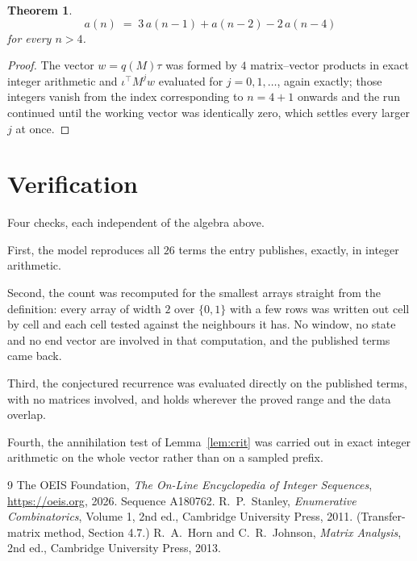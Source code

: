 \documentclass[11pt,a4paper]{article}
\theoremstyle{plain}
\newtheorem{theorem}{Theorem}
\theoremstyle{definition}
\begin{document}
\begin{theorem}
\[
a(n)\;=\;3\,a(n-1) + a(n-2) - 2\,a(n-4)
\]
for every $n>4$.
\end{theorem}

\begin{proof}
The vector $w=q(M)\tau$ was formed by $4$ matrix--vector products in exact integer
arithmetic and $\iota^{\!\top}M^{j}w$ evaluated for $j=0,1,\dots$, again exactly; those
integers vanish from the index corresponding to $n=4+1$ onwards and the run continued
until the working vector was identically zero, which settles every larger $j$ at once.
\end{proof}

\section{Verification}

Four checks, each independent of the algebra above.

First, the model reproduces all $26$ terms the entry publishes, exactly, in integer
arithmetic.

Second, the count was recomputed for the smallest arrays straight from the definition: every
array of width $2$ over $\{0,1\}$ with a few rows was written out cell by cell and each cell
tested against the neighbours it has. No window, no state and no end vector are involved in that
computation, and the published terms came back.

Third, the conjectured recurrence was evaluated directly on the published terms, with no
matrices involved, and holds wherever the proved range and the data overlap.

Fourth, the annihilation test of Lemma~\ref{lem:crit} was carried out in exact integer
arithmetic on the whole vector rather than on a sampled prefix.

\begin{thebibliography}{9}
 The OEIS Foundation, \emph{The On-Line Encyclopedia of Integer
Sequences}, \url{https://oeis.org}, 2026. Sequence A180762.
 R.~P.~Stanley, \emph{Enumerative Combinatorics}, Volume 1, 2nd ed.,
Cambridge University Press, 2011. (Transfer-matrix method, Section 4.7.)
 R.~A.~Horn and C.~R.~Johnson, \emph{Matrix Analysis}, 2nd ed., Cambridge
University Press, 2013.
\end{thebibliography}
\end{document}
